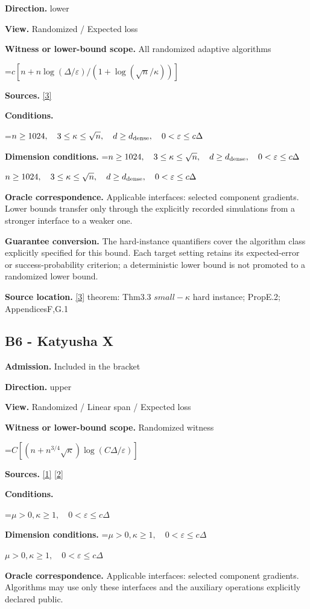\documentclass[10pt,a4paper]{article}
\newcommand{\AtlasMath}[1]{\par\begingroup\centering\setbox0=\hbox{$\displaystyle #1$}\ifdim\wd0>1.4\linewidth\typeout{ATLAS WIDE FORMULA: \the\wd0}\fi\ifdim\wd0>\linewidth\resizebox{\linewidth}{!}{\box0}\else\box0\fi\par\endgroup}
\newcommand{\AtlasInlineMath}[1]{\begingroup\setbox0=\hbox{$#1$}\ifdim\wd0>.4\linewidth\endgroup\AtlasMath{#1}\else\endgroup$#1$\fi}
\begin{document}
\textbf{Direction.} lower

\textbf{View.} Randomized / Expected loss

\textbf{Witness or lower-bound scope.} All randomized adaptive algorithms

\AtlasMath{c[n+n\log(\Delta/\varepsilon)/(1+\log(\sqrt n/\kappa))]}
\textbf{Sources.} \href{https://arxiv.org/pdf/2609.00045v3}{[3]}

\textbf{Conditions.} 
\AtlasMath{n\ge1024,\quad3\le\kappa\le\sqrt n,\quad d\ge d_{\rm dense},\quad0<\varepsilon\le c\Delta}


\textbf{Dimension conditions.} \AtlasInlineMath{n\ge1024,\quad3\le\kappa\le\sqrt n,\quad d\ge d_{\rm dense},\quad0<\varepsilon\le c\Delta}

\textbf{Oracle correspondence.} Applicable interfaces: selected component gradients. Lower bounds transfer only through the explicitly recorded simulations from a stronger interface to a weaker one.

\textbf{Guarantee conversion.} The hard-instance quantifiers cover the algorithm class explicitly specified for this bound. Each target setting retains its expected-error or success-probability criterion; a deterministic lower bound is not promoted to a randomized lower bound.

\textbf{Source location.} \href{https://arxiv.org/pdf/2609.00045v3}{[3]} theorem: Thm3.3 $small-\kappa$ hard instance; PropE.2; AppendicesF,G.1

\subsection{B6 - Katyusha X}
\textbf{Admission.} Included in the bracket

\textbf{Direction.} upper

\textbf{View.} Randomized / Linear span / Expected loss

\textbf{Witness or lower-bound scope.} Randomized witness

\AtlasMath{C[(n+n^{3/4}\sqrt\kappa)\log(C\Delta/\varepsilon)]}
\textbf{Sources.} \href{https://arxiv.org/pdf/1802.03866}{[1]} \href{https://proceedings.mlr.press/v97/zhou19b/zhou19b.pdf}{[2]}

\textbf{Conditions.} 
\AtlasMath{\mu>0,\kappa\ge1,\quad0<\varepsilon\le c\Delta}


\textbf{Dimension conditions.} \AtlasInlineMath{\mu>0,\kappa\ge1,\quad0<\varepsilon\le c\Delta}

\textbf{Oracle correspondence.} Applicable interfaces: selected component gradients. Algorithms may use only these interfaces and the auxiliary operations explicitly declared public.
\end{document}
